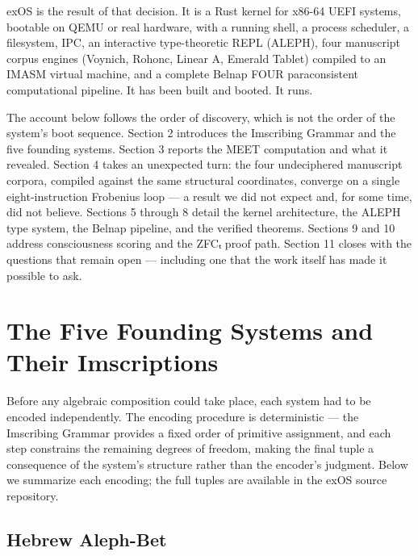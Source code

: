\documentclass[12pt,a4paper]{article}
\begin{document}
exOS is the result of that decision. It is a Rust kernel for x86-64 UEFI systems, bootable on QEMU or real hardware, with a running shell, a process scheduler, a filesystem, IPC, an interactive type-theoretic REPL (ALEPH), four manuscript corpus engines (Voynich, Rohonc, Linear A, Emerald Tablet) compiled to an IMASM virtual machine, and a complete Belnap FOUR paraconsistent computational pipeline. It has been built and booted. It runs.

The account below follows the order of discovery, which is not the order of the system's boot sequence. Section 2 introduces the Imscribing Grammar and the five founding systems. Section 3 reports the MEET computation and what it revealed. Section 4 takes an unexpected turn: the four undeciphered manuscript corpora, compiled against the same structural coordinates, converge on a single eight-instruction Frobenius loop --- a result we did not expect and, for some time, did not believe. Sections 5 through 8 detail the kernel architecture, the ALEPH type system, the Belnap pipeline, and the verified theorems. Sections 9 and 10 address consciousness scoring and the ZFCₜ proof path. Section 11 closes with the questions that remain open --- including one that the work itself has made it possible to ask.

\section{The Five Founding Systems and Their Imscriptions}

Before any algebraic composition could take place, each system had to be encoded independently. The encoding procedure is deterministic --- the Imscribing Grammar provides a fixed order of primitive assignment, and each step constrains the remaining degrees of freedom, making the final tuple a consequence of the system's structure rather than the encoder's judgment. Below we summarize each encoding; the full tuples are available in the exOS source repository.

\subsection{Hebrew Aleph-Bet}
\end{document}
